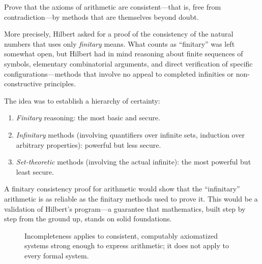 \begin{problem_statement}
Prove that the axioms of arithmetic are consistent---that is, free from contradiction---by methods that are themselves beyond doubt.
\end{problem_statement}

More precisely, Hilbert asked for a proof of the consistency of the natural numbers that uses only \emph{finitary} means. What counts as ``finitary'' was left somewhat open, but Hilbert had in mind reasoning about finite sequences of symbols, elementary combinatorial arguments, and direct verification of specific configurations---methods that involve no appeal to completed infinities or non-constructive principles.

The idea was to establish a hierarchy of certainty:
\begin{enumerate}
    \item \emph{Finitary} reasoning: the most basic and secure.
    \item \emph{Infinitary} methods (involving quantifiers over infinite sets, induction over arbitrary properties): powerful but less secure.
    \item \emph{Set-theoretic} methods (involving the actual infinite): the most powerful but least secure.
\end{enumerate}

A finitary consistency proof for arithmetic would show that the ``infinitary'' arithmetic is as reliable as the finitary methods used to prove it. This would be a validation of Hilbert's program---a guarantee that mathematics, built step by step from the ground up, stands on solid foundations.

\begin{figure}[htbp]
\centering
{}
\caption{Incompleteness applies to consistent, computably axiomatized systems strong enough to express arithmetic; it does not apply to every formal system.}
\label{fig:godel-incompleteness}
\end{figure}

